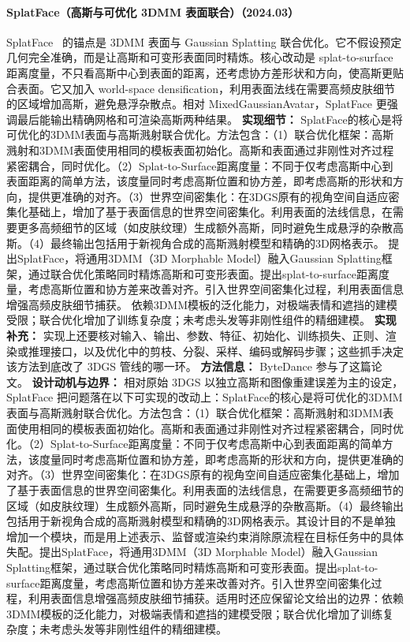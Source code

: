 \paragraph{SplatFace（高斯与可优化 3DMM 表面联合）（2024.03）}
SplatFace~\cite{2403_18784} 的锚点是 3DMM 表面与 Gaussian Splatting 联合优化。它不假设预定几何完全准确，而是让高斯和可变形表面同时精炼。核心改动是 splat-to-surface 距离度量，不只看高斯中心到表面的距离，还考虑协方差形状和方向，使高斯更贴合表面。它又加入 world-space densification，利用表面法线在需要高频皮肤细节的区域增加高斯，避免悬浮杂散点。相对 MixedGaussianAvatar，SplatFace 更强调最后能输出精确网格和可渲染高斯两种结果。
\textbf{实现细节：} SplatFace的核心是将可优化的3DMM表面与高斯溅射联合优化。方法包含：（1）联合优化框架：高斯溅射和3DMM表面使用相同的模板表面初始化。高斯和表面通过非刚性对齐过程紧密耦合，同时优化。（2）Splat-to-Surface距离度量：不同于仅考虑高斯中心到表面距离的简单方法，该度量同时考虑高斯位置和协方差，即考虑高斯的形状和方向，提供更准确的对齐。（3）世界空间密集化：在3DGS原有的视角空间自适应密集化基础上，增加了基于表面信息的世界空间密集化。利用表面的法线信息，在需要更多高频细节的区域（如皮肤纹理）生成额外高斯，同时避免生成悬浮的杂散高斯。（4）最终输出包括用于新视角合成的高斯溅射模型和精确的3D网格表示。 提出SplatFace，将通用3DMM（3D Morphable Model）融入Gaussian Splatting框架，通过联合优化策略同时精炼高斯和可变形表面。提出splat-to-surface距离度量，考虑高斯位置和协方差来改善对齐。引入世界空间密集化过程，利用表面信息增强高频皮肤细节捕获。 依赖3DMM模板的泛化能力，对极端表情和遮挡的建模受限；联合优化增加了训练复杂度；未考虑头发等非刚性组件的精细建模。
\textbf{实现补充：} 实现上还要核对输入、输出、参数、特征、初始化、训练损失、正则、渲染或推理接口，以及优化中的剪枝、分裂、采样、编码或解码步骤；这些抓手决定该方法到底改了 3DGS 管线的哪一环。
\textbf{方法信息：} ByteDance 参与了这篇论文。
\textbf{设计动机与边界：} 相对原始 3DGS 以独立高斯和图像重建误差为主的设定，SplatFace 把问题落在以下可实现的改动上：SplatFace的核心是将可优化的3DMM表面与高斯溅射联合优化。方法包含：（1）联合优化框架：高斯溅射和3DMM表面使用相同的模板表面初始化。高斯和表面通过非刚性对齐过程紧密耦合，同时优化。（2）Splat-to-Surface距离度量：不同于仅考虑高斯中心到表面距离的简单方法，该度量同时考虑高斯位置和协方差，即考虑高斯的形状和方向，提供更准确的对齐。（3）世界空间密集化：在3DGS原有的视角空间自适应密集化基础上，增加了基于表面信息的世界空间密集化。利用表面的法线信息，在需要更多高频细节的区域（如皮肤纹理）生成额外高斯，同时避免生成悬浮的杂散高斯。（4）最终输出包括用于新视角合成的高斯溅射模型和精确的3D网格表示。其设计目的不是单独增加一个模块，而是用上述表示、监督或渲染约束消除原流程在目标任务中的具体失配。提出SplatFace，将通用3DMM（3D Morphable Model）融入Gaussian Splatting框架，通过联合优化策略同时精炼高斯和可变形表面。提出splat-to-surface距离度量，考虑高斯位置和协方差来改善对齐。引入世界空间密集化过程，利用表面信息增强高频皮肤细节捕获。适用时还应保留论文给出的边界：依赖3DMM模板的泛化能力，对极端表情和遮挡的建模受限；联合优化增加了训练复杂度；未考虑头发等非刚性组件的精细建模。
